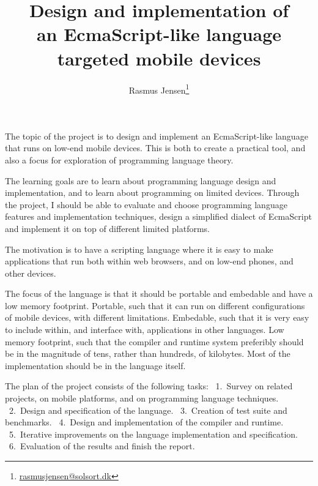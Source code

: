 \documentclass[12pt]{article}
\title{Design and implementation of \\ an EcmaScript-like language \\ targeted mobile devices}
\author{Rasmus Jensen\footnote{\url{rasmusjensen@solsort.dk}}
}
\begin{document}
\maketitle



The topic of the project is to design and implement an EcmaScript-like language that runs on low-end mobile devices.
This is both to create a practical tool, 
and also a focus for exploration of programming language theory.

The learning goals are 
to learn about programming language design and implementation, 
and to learn about programming on limited devices.
Through the project, I should be able to evaluate and choose programming language features and implementation techniques, design a simplified dialect of EcmaScript and implement it on top of different limited platforms.


The motivation
is to have a scripting language where it is easy to make applications that run both within web browsers, and on low-end phones, and other devices.




The focus of the language is that it should be portable and embedable and have a low memory footprint. 
Portable, such that it can run on different configurations of mobile devices, with different limitations.
Embedable, such that it is very easy to include within, and interface with, applications in other languages.
Low memory footprint, such that the compiler and runtime system preferibly should be in the magnitude of tens, rather than hundreds, of kilobytes.
Most of the implementation should be in the language itself.

The plan of the project consists of the following tasks:
~1.~Survey on related projects, on mobile platforms, and on programming language techniques.
~\mbox{2.~Design} and specification of the language.
~3.~Creation of test suite and benchmarks.
~4.~Design and implementation of the compiler and runtime.
~\mbox{5.~Iterative} improvements on the language implementation and specification.
~6.~Evaluation of the results and finish the report.
\end{document}
